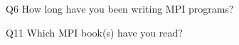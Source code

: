 \begin{description}%
\item{Q6} How long have you been writing MPI programs?%
\item{Q11} Which MPI book(s) have you read?%
\end{description}%
